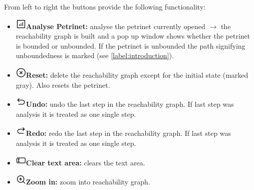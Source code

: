\documentclass[10pt, a4paper]{article}
\begin{document}
From left to right the buttons provide the following functionality:
\begin{itemize}
\item\includegraphics[scale=0.4]{../src/resources/images/Toolbar/stats.png}\hspace{0.1cm}\textbf{Analyse Petrinet:} analyse the petrinet currently opened $\rightarrow$ the reachability graph is built and a pop up window shows whether the petrinet is bounded or unbounded. If the petrinet is unbounded the path signifying unboundedness is marked (see \ref{label:introduction}). 
\item\includegraphics[scale=0.4]{../src/resources/images/Toolbar/delete.png}\hspace{0.1cm}\textbf{Reset:} delete the reachability graph except for the initial state (marked gray). Also resets the petrinet. 
\item\includegraphics[scale=0.4]{../src/resources/images/Toolbar/undo.png}\hspace{0.1cm}\textbf{Undo:} undo the last step in the reachability graph. If last step was analysis it is treated as one single step.
\item\includegraphics[scale=0.4]{../src/resources/images/Toolbar/redo.png}\hspace{0.1cm}\textbf{Redo:} redo the last step in the reachability graph. If last step was analysis it is treated as one single step.
\item\includegraphics[scale=0.4]{../src/resources/images/Toolbar/input.png}\hspace{0.1cm}\textbf{Clear text area:} clears the text area.
\item\includegraphics[scale=0.4]{../src/resources/images/Toolbar/zoom-in.png}\hspace{0.1cm}\textbf{Zoom in:} zoom into reachability graph.

\end{itemize}
\end{document}
